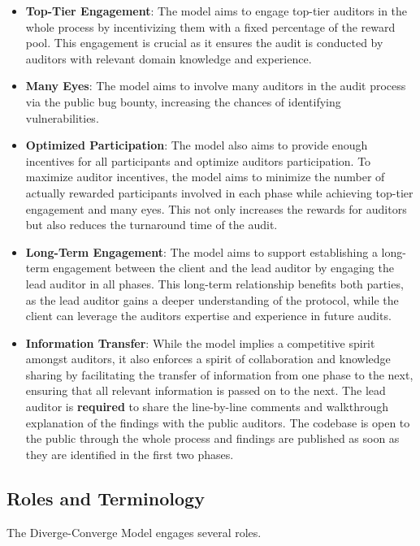 \documentclass[10pt]{extarticle}
\begin{document}
\begin{itemize}
\item
  \textbf{Top-Tier Engagement}: The model aims to engage top-tier
  auditors in the whole process by incentivizing them with a fixed
  percentage of the reward pool. This engagement is crucial as it
  ensures the audit is conducted by auditors with relevant domain
  knowledge and experience.
\item
  \textbf{Many Eyes}: The model aims to involve many auditors in the
  audit process via the public bug bounty, increasing the chances of
  identifying vulnerabilities.
\item
  \textbf{Optimized Participation}: The model also aims to provide
  enough incentives for all participants and optimize
  auditors\textquotesingle{} participation. To maximize auditor
  incentives, the model aims to minimize the number of actually rewarded
  participants involved in each phase while achieving top-tier
  engagement and many eyes. This not only increases the rewards for
  auditors but also reduces the turnaround time of the audit.
\item
  \textbf{Long-Term Engagement}: The model aims to support establishing
  a long-term engagement between the client and the lead auditor by
  engaging the lead auditor in all phases. This long-term relationship
  benefits both parties, as the lead auditor gains a deeper
  understanding of the protocol, while the client can leverage the
  auditor\textquotesingle s expertise and experience in future audits.
\item
  \textbf{Information Transfer}: While the model implies a competitive
  spirit amongst auditors, it also enforces a spirit of collaboration
  and knowledge sharing by facilitating the transfer of information from
  one phase to the next, ensuring that all relevant information is
  passed on to the next. The lead auditor is \textbf{required} to share
  the line-by-line comments and walkthrough explanation of the findings
  with the public auditors. The codebase is open to the public through
  the whole process and findings are published as soon as they are
  identified in the first two phases.
\end{itemize}

\subsection{ Roles and Terminology}\label{42-roles-and-terminology}

The Diverge-Converge Model engages several roles.
\end{document}

